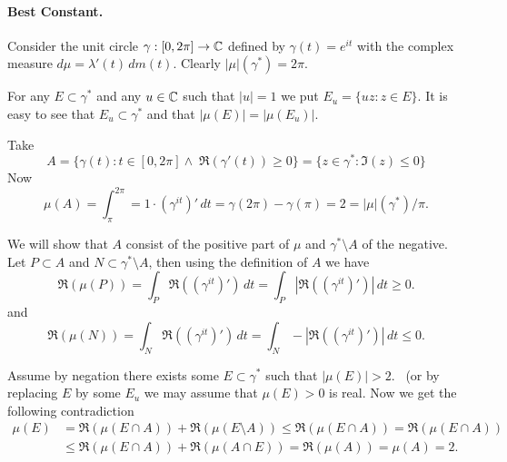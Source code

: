 \begin{enumerate}
\paragraph{Best Constant.}
Consider the unit circle \(\gamma:[0,2\pi]\to\mathbb{C}\) 
defined by \(\gamma(t) = e^{it}\) with the complex measure
\(d\mu = \lambda'(t)\,dm(t)\).
Clearly \(|\mu|(\gamma^*) = 2\pi\).

For any \(E\subset \gamma^*\) and any \(u\in\mathbb{C}\) such that \(|u|=1\)
we put \(E_u = \{uz: z\in E\}\).
It is easy to see that \(E_u\subset \gamma^*\) and that 
\(|\mu(E)| = |\mu(E_u)|\).

Take 
\begin{equation*}
A = \{\gamma(t): t\in[0,2\pi] \wedge\;\Re(\gamma'(t)) \geq 0\}
  = \{z\in\gamma^{*}: \Im(z) \leq 0\}
\end{equation*}
Now
\begin{equation*}
\mu(A) = \int_{\pi}^{2\pi} = 1\cdot(\gamma^{it})'\,dt
 = \gamma(2\pi) - \gamma(\pi) = 2 = |\mu|(\gamma^*)/\pi.
\end{equation*}

We will show that $A$ consist of the positive part of \(\mu\)
and \(\gamma^*\setminus A\) of the negative.
Let \(P \subset A\) and \(N \subset \gamma^*\setminus A\), then
using the definition of $A$ we have
\begin{equation*}
\Re(\mu(P)) 
= \int_P \Re\left((\gamma^{it})'\right)\,dt
= \int_P \left|\Re\left((\gamma^{it})'\right)\right|\,dt
\geq 0.
\end{equation*}
and
\begin{equation*}
\Re(\mu(N)) 
= \int_N \Re\left((\gamma^{it})'\right)\,dt
= \int_N -\left|\Re\left((\gamma^{it})'\right)\right|\,dt
\leq 0.
\end{equation*}

Assume by negation there exists some \(E\subset\gamma^*\) such that 
\(|\mu(E)| > 2\). \Wlogy\ (or by replacing $E$ by some \(E_u\)
we may assume that \(\mu(E) > 0\) is real.
Now we get the following contradiction
\begin{align*}
\mu(E) 
&= \Re(\mu(E\cap A)) + \Re(\mu(E\setminus A))
 \leq \Re(\mu(E\cap A))
 = \Re(\mu(E\cap A)) \\
&\leq \Re(\mu(E\cap A)) + \Re(\mu(A\cap E))
 = \Re(\mu(A)) 
 = \mu(A)
 = 2.
\end{align*}


\end{enumerate}
